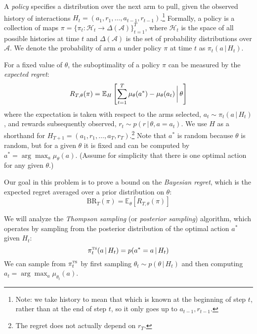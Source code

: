\documentclass[11pt]{article}
\newcommand{\E}{\mathbb E}
\newcommand{\given}{\,|\,}
\newcommand{\biggiven}{\,\bigg{|}\,}
\renewcommand{\H}{\mathcal{H}}
\newcommand{\cA}{\mathcal{A}}
\renewcommand{\d}[1]{\,\mathrm{d}#1}
\newcommand{\piTS}{\pi^{\textsc{ts}}}
\begin{document}
A \textit{policy} specifies a distribution over the next arm to pull, given the observed history of interactions $H_t = (a_1, r_1, \dots, a_{t-1}, r_{t-1})$.\footnote{Note: we take history to mean that which is known at the beginning of step $t$, rather than at the end of step $t$, so it only goes up to $a_{t-1}, r_{t-1}$.}
Formally, a policy is a collection of maps $\pi = \{\pi_t : \H_t \to \Delta(\cA)\}_{t=1}^T$, where $\H_t$ is the space of all possible histories at time $t$ and $\Delta(\cA)$ is the set of probability distributions over $\cA$. We denote the probability of arm $a$ under policy $\pi$ at time $t$ as $\pi_t(a \given H_t)$.

For a fixed value of $\theta$, the suboptimality of a policy $\pi$ can be measured by the \textit{expected regret}:
$$
R_{T, \theta}(\pi) = \E_H\left[\sum_{t=1}^T \mu_\theta(a^*) - \mu_\theta(a_t) \biggiven \theta\right]
$$
where the expectation is taken with respect to the arms selected, $a_t \sim \pi_t(a \given H_t)$, and rewards subsequently observed, $r_t \sim p(r \given \theta, a=a_t)$. We use $H$ as a shorthand for $H_{T+1} = (a_1, r_1, \dots, a_T, r_T)$.\footnote{The regret does not actually depend on $r_T$.} Note that $a^*$ is random because $\theta$ is random, but for a given $\theta$ it is fixed and can be computed by $a^* = \arg\max_a \mu_{\theta}(a)$. (Assume for simplicity that there is one optimal action for any given $\theta$.)

Our goal in this problem is to prove a bound on the \textit{Bayesian regret}, which is the expected regret averaged over a prior distribution on $\theta$:
$$
\text{BR}_T(\pi) = \E_{\theta}[R_{T, \theta}(\pi)]
$$

We will analyze the \textit{Thompson sampling} (or \textit{posterior sampling}) algorithm, which operates by sampling from the posterior distribution of the optimal action $a^*$ given $H_t$:
$$
\piTS_t(a \given H_t) = p(a^*=a \given H_t) %
$$
We can sample from $\piTS_t$ by first sampling $\theta_t \sim p(\theta \given H_t)$ and then computing $a_t = \arg\max_a \mu_{\theta_t}(a)$.
\end{document}
